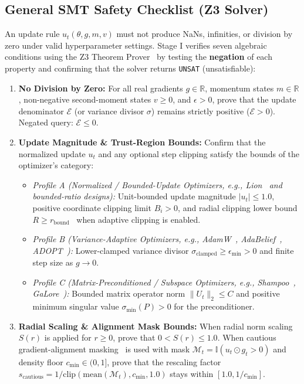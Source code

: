 \documentclass[11pt,a4paper]{article}
\renewcommand{\_}{\origunderscore\allowbreak}
\begin{document}
\subsection{General SMT Safety Checklist (Z3 Solver)}
\noindent
An update rule $u_t(\theta, g, m, v)$ must not produce NaNs, infinities, or division by zero under valid hyperparameter settings. Stage I verifies seven algebraic conditions using the Z3 Theorem Prover~\cite{demoura2008z3} by testing the \textbf{negation} of each property and confirming that the solver returns \texttt{UNSAT} (unsatisfiable):

\begin{enumerate}[label=\textbf{Q\arabic*.}, leftmargin=2.4em, itemsep=0.45em]
    \item \textbf{No Division by Zero:} For all real gradients $g \in \mathbb{R}$, momentum states $m \in \mathbb{R}$, non-negative second-moment states $v \ge 0$, and $\epsilon > 0$, prove that the update denominator $\mathcal{E}$ (or variance divisor $\sigma$) remains strictly positive ($\mathcal{E} > 0$). Negated query: $\mathcal{E} \le 0$.

    \item \textbf{Update Magnitude \& Trust-Region Bounds:} Confirm that the normalized update $u_t$ and any optional step clipping satisfy the bounds of the optimizer's category:
    \begin{itemize}[leftmargin=1.5em, itemsep=0.25em]
        \item \textit{Profile A (Normalized / Bounded-Update Optimizers, e.g., Lion~\cite{chen2023lion} and bounded-ratio designs):} Unit-bounded update magnitude $|u_t| \le 1.0$, positive coordinate clipping limit $B_i > 0$, and radial clipping lower bound $R \ge r_{\text{bound}}$~\cite{brock2021nfnet} when adaptive clipping is enabled.
        \item \textit{Profile B (Variance-Adaptive Optimizers, e.g., AdamW~\cite{loshchilov2019adamw}, AdaBelief~\cite{zhuang2020adabelief}, ADOPT~\cite{taniguchi2024adopt}):} Lower-clamped variance divisor $\sigma_{\text{clamped}} \ge \epsilon_{\min} > 0$ and finite step size as $g \to 0$.
        \item \textit{Profile C (Matrix-Preconditioned / Subspace Optimizers, e.g., Shampoo~\cite{gupta2018shampoo}, GaLore~\cite{zhao2024galore}):} Bounded matrix operator norm $\|U_t\|_2 \le C$ and positive minimum singular value $\sigma_{\min}(P) > 0$ for the preconditioner.
    \end{itemize}

    \item \textbf{Radial Scaling \& Alignment Mask Bounds:} When radial norm scaling $S(r)$ is applied for $r \ge 0$, prove that $0 < S(r) \le 1.0$. When cautious gradient-alignment masking~\cite{liang2026cautious} is used with mask $\mathcal{M}_t = \mathbb{I}(u_t \odot g_t > 0)$ and density floor $c_{\min} \in (0, 1]$, prove that the rescaling factor $s_{\text{cautious}} = 1/\mathrm{clip}(\mathrm{mean}(\mathcal{M}_t), c_{\min}, 1.0)$ stays within $[1.0, 1/c_{\min}]$.


\end{enumerate}
\end{document}
